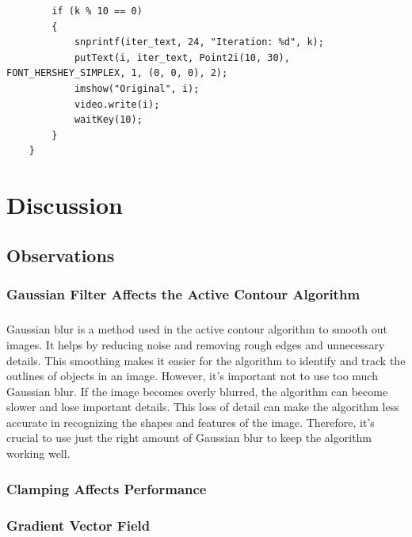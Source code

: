 \documentclass[12pt,a4paper]{report}
\begin{document}
\begin{lstlisting}
        if (k % 10 == 0)
        {
            snprintf(iter_text, 24, "Iteration: %d", k);
            putText(i, iter_text, Point2i(10, 30), FONT_HERSHEY_SIMPLEX, 1, (0, 0, 0), 2);
            imshow("Original", i);
            video.write(i);
            waitKey(10);
        }
    }
\end{lstlisting}

\clearpage



\chapter{Discussion}
\section{Observations}
\subsection{Gaussian Filter Affects the Active Contour Algorithm}
\paragraph*{}
Gaussian blur is a method used in the active contour algorithm to smooth out images. It helps by reducing noise and removing rough edges and unnecessary details. This smoothing makes it easier for the algorithm to identify and track the outlines of objects in an image. However, it's important not to use too much Gaussian blur. If the image becomes overly blurred, the algorithm can become slower and lose important details. This loss of detail can make the algorithm less accurate in recognizing the shapes and features of the image. Therefore, it's crucial to use just the right amount of Gaussian blur to keep the algorithm working well.
\subsection{Clamping Affects Performance}
\paragraph*{}

\subsection{Gradient Vector Field}
\paragraph*{}
\end{document}
